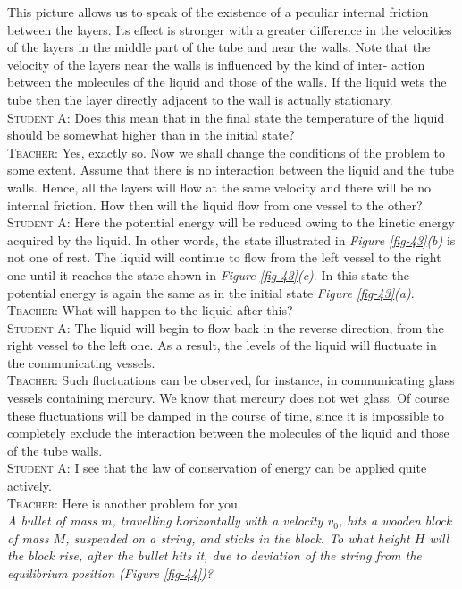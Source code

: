 \documentclass[a4paper,sfsidenotes]{tufte-book}
\begin{document}
This picture allows us to speak of the existence of a peculiar internal friction between the layers. Its effect is stronger with a greater difference in the velocities of the layers in the middle part of the tube and near the walls. Note that the velocity of the layers near the walls is influenced by the kind of inter-
action between the molecules of the liquid and those of the walls. If the liquid wets the tube then the layer directly adjacent to the wall is actually stationary.
\\
\textsc{Student A:} Does this mean that in the final state the temperature of the liquid should be somewhat higher than in the initial state?
\\
\textsc{Teacher:} Yes, exactly so. Now we shall change the conditions of the problem to some extent. Assume that there is no interaction between the liquid and the tube walls. Hence, all the layers will flow at the same velocity and there will be no internal friction. How then will the liquid flow from one
vessel to the other?
\\
\textsc{Student A:} Here the potential energy will be reduced owing to the kinetic energy acquired by the liquid. In other words, the state illustrated in \emph{Figure \ref{fig-43}(b)} is not one of rest. The liquid will continue to flow from the left vessel to the right one until it reaches the state shown in \emph{Figure \ref{fig-43}(c)}. In this state the potential energy is again the same as in the initial state \emph{Figure \ref{fig-43}(a)}.
\\
\textsc{Teacher:} What will happen to the liquid after this?
\\
\textsc{Student A:} The liquid will begin to flow back in the reverse direction, from the right vessel to the left one. As a result, the levels of the liquid will fluctuate in the communicating vessels.
\\
\textsc{Teacher:} Such fluctuations can be observed, for instance, in communicating glass vessels containing mercury. We know that mercury does not wet glass. Of course these fluctuations will be damped in the course of time, since it is impossible to completely exclude the interaction between the
molecules of the liquid and those of the tube walls.
\\
\textsc{Student A:} I see that the law of conservation of energy can be applied quite actively.
\\
\textsc{Teacher:} Here is another problem for you. \\
\emph{A bullet of mass $m$, travelling horizontally with a velocity $v_{0}$, hits a wooden block of mass $M$, suspended on a string, and sticks in the block. To what height $H$ will the block rise, after the bullet hits it, due to deviation of the string from the equilibrium position (\emph{Figure \ref{fig-44}})?}
\end{document}
